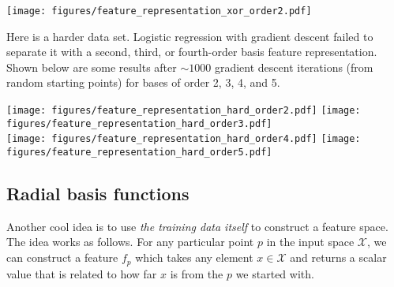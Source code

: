 \begin{examplebox}
\begin{center}
\texttt{[image: figures/feature\_representation\_xor\_order2.pdf]}
\end{center}
\end{examplebox}

Here is a harder data set.  Logistic regression with gradient descent
failed to separate it with a second, third, or fourth-order basis feature
representation.  Shown below are some results after $\sim1000$
gradient descent iterations (from random starting points) for bases of
order 2, 3, 4, and 5.
\begin{examplebox}
\begin{center}
\texttt{[image: figures/feature\_representation\_hard\_order2.pdf]}
\texttt{[image: figures/feature\_representation\_hard\_order3.pdf]} \\
\texttt{[image: figures/feature\_representation\_hard\_order4.pdf]}
\texttt{[image: figures/feature\_representation\_hard\_order5.pdf]}
\end{center}
\end{examplebox}




\subsection{Radial basis functions}

Another cool idea is to use {\em the training data itself} to
construct a feature space.  The idea works as follows.  For any
particular point $p$ in the input space $\mathcal{X}$, we can construct a feature
$f_p$ which takes any element $x \in \mathcal{X}$ and returns a
scalar value that is related to how far $x$ is from the $p$ we started
with.

